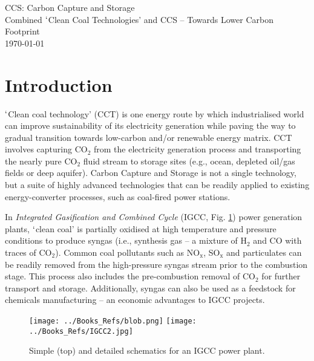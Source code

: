 \documentclass[14pt,twoside]{article}
\begin{document}

\bigskip

\begin{center}
{\Large CCS: Carbon Capture and Storage}\\
{\large Combined $\lq$Clean Coal Technologies' and CCS -- Towards Lower Carbon Footprint}\\
{\large \today}
\end{center}


\section{Introduction}

$\lq$Clean coal technology' (CCT) is one energy route by which industrialised world can improve sustainability of its electricity generation while paving the way to gradual transition towards low-carbon and/or renewable energy matrix. CCT involves capturing CO$_{2}$ from the electricity generation process and transporting the nearly pure CO$_{2}$ fluid stream to storage sites (e.g., ocean, depleted oil/gas fields or deep aquifer). Carbon Capture and Storage is not a single technology, but a suite of highly advanced technologies that can be readily applied to existing energy-converter processes, such as coal-fired power stations.

In {\it Integrated Gasification and Combined Cycle} (IGCC, Fig. \ref{pic:igcc}) power generation plants, $\lq$clean coal' is partially oxidised at high temperature and pressure conditions to produce syngas (i.e., synthesis gas -- a mixture of H$_{2}$ and CO with traces of CO$_{2}$). Common coal pollutants such as NO$_{\text{x}}$, SO$_{\text{x}}$ and particulates can be readily removed from the high-pressure syngas stream prior to the combustion stage. This process also includes the pre-combustion removal of CO$_{2}$ for further transport and storage. Additionally, syngas can also be used as a feedstock for chemicals manufacturing -- an economic advantages to IGCC projects.


\begin{figure}[h]
\begin{center}
\texttt{[image: ../Books\_Refs/blob.png]}
\texttt{[image: ../Books\_Refs/IGCC2.jpg]}
\caption{Simple (top) and detailed schematics for an IGCC power plant.}\label{pic:igcc}
\end{center}
\end{figure}
\end{document}
